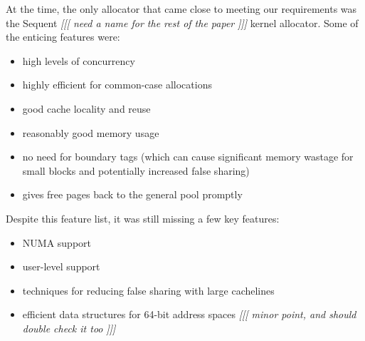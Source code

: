 \documentclass[dvips,11pt]{article}
\newcommand\fixnote[1]{\emph{[[[ #1 ]]]}}
\begin{document}
At the time, the only allocator that came close to meeting our requirements 
was the Sequent \fixnote{need a name for the rest of the paper} kernel
allocator.  Some of the enticing features were:
\begin{itemize}
\item high levels of concurrency
\item highly efficient for common-case allocations
\item good cache locality and reuse
\item reasonably good memory usage
\item no need for boundary tags (which can cause significant memory wastage
  for small blocks and potentially increased false sharing)
\item gives free pages back to the general pool promptly
\end{itemize}

Despite this feature list, it was still missing a few key features:
\begin{itemize}
\item NUMA support
\item user-level support
\item techniques for reducing false sharing with large cachelines
\item efficient data structures for 64-bit address spaces \fixnote{minor point, and should double check it too}
\end{itemize}
\end{document}
